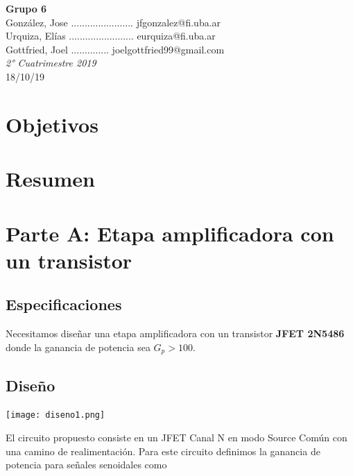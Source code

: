     \begin{center}
        \textbf{Grupo 6}\\
        \medskip
        González, Jose ....................... jfgonzalez@fi.uba.ar\\
        Urquiza, Elías ........................ eurquiza@fi.uba.ar\\
				Gottfried, Joel .............. joelgottfried99@gmail.com\\
        \medskip
        \emph{2° Cuatrimestre 2019}\\
        18/10/19
    \end{center}
    \begin{multicols}{2}
    \justifying
        \section{Objetivos}

        \section{Resumen}

        \section{Parte A: Etapa amplificadora con un transistor}

        \subsection{Especificaciones}

        Necesitamos diseñar una etapa amplificadora con un transistor \textbf{JFET 2N5486} donde la ganancia de potencia sea $G_p > 100$.

        \subsection{Diseño}

        \begin{center}
                   \texttt{[image: diseno1.png]}
                   \label{fig:etapa_amp}
        \end{center}


        El circuito propuesto consiste en un JFET Canal N en modo Source Común con una camino de realimentación. Para este circuito definimos la ganancia de potencia para señales senoidales como


\end{multicols}
